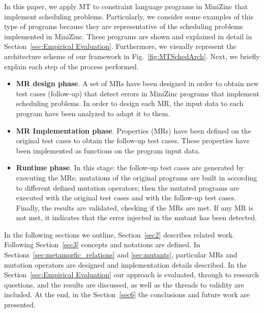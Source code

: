 In this paper, we apply MT to constraint language programs in
MiniZinc that implement scheduling problems. Particularly, we consider some 
examples of this type of programs because they are representative of the 
scheduling problems implemented in MiniZinc. These programs are shown and 
explained in detail in Section~\ref{sec:Empirical Evaluation}. Furthermore, 
we visually represent the architecture scheme of our framework 
in Fig.~\ref{fig:MTSchedArch}. Next, we briefly explain 
each step of the process performed.
\begin{itemize}
    \item \textbf{MR design phase}. A set of MRs have been designed in order to 
    obtain new test cases (follow-up) that detect errors in MiniZinc programs that implement scheduling problems.
    In order to design each MR, the input data to each program have been 
    analyzed to adapt it to them.
    \item \textbf{MR Implementation phase}. Properties (MRs) have been defined on the original test cases to obtain the follow-up test cases. These properties have been implemented as functions on the program input data.
    \item \textbf{Runtime phase}. In this stage: the follow-up test cases are 
    generated by executing the MRs; mutations of the original programs are built 
    in according to different defined mutation operators; then the mutated 
    programs are executed with the original test cases and with the follow-up test cases. 
    Finally, the results are validated, checking if the MRs are met. If any MR is not met, it indicates that the error injected in the mutant has been detected.
\end{itemize}



In the following sections we outline, Section~\ref{sec2} describes related work.
Following Section~\ref{sec3} concepts and notations are defined. In  Sections~\ref{sec:metamorfic_relations} and \ref{sec:mutants}, particular MRs and mutation operators are designed and implementation details described. In the Section~\ref{sec:Empirical Evaluation} our approach is evaluated, 
through to research questions, and the results are discussed, as well as the threads to validity are included. At the end, in the Section~\ref{sec6} the conclusions and future work are presented.









